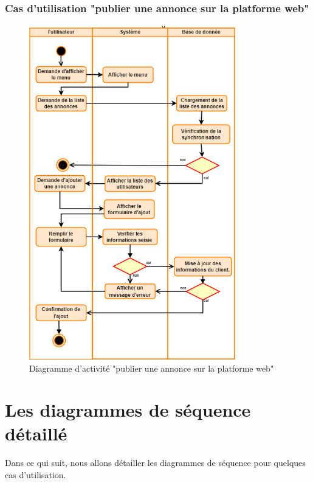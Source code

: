 \documentclass[edit,12pt,a4paper,ChapStyle,oneside,doubleinterligne]{report}
\begin{document}
\subsubsection{Cas d'utilisation "publier une annonce sur la platforme web"}
\begin{figure}[h!]\label{fig:activite publier}
    \centering
    \includegraphics[width=0.8\textwidth]{images/act Publier une annonce sur la platforme web.png}
    \caption{Diagramme d'activité "publier une annonce sur la platforme web"}
\end{figure}
\clearpage



\section{Les diagrammes de séquence détaillé}
Dans ce qui suit, nous allons détailler les diagrammes de séquence pour quelques cas d'utilisation.
\end{document}
